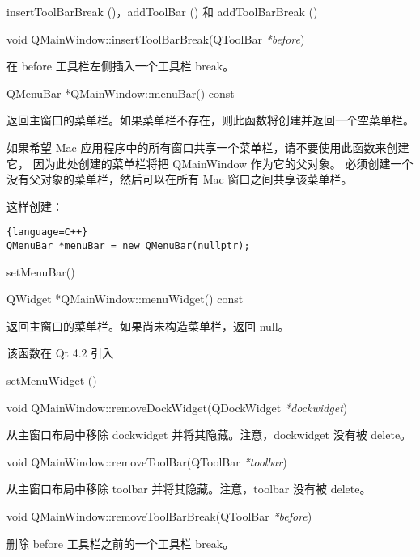 \begin{seeAlso}
insertToolBarBreak ()，addToolBar () 和 addToolBarBreak ()
\end{seeAlso}

\splitLine

void QMainWindow::insertToolBarBreak(QToolBar \emph{*before})

在 before 工具栏左侧插入一个工具栏 break。

\splitLine

QMenuBar *QMainWindow::menuBar() const

返回主窗口的菜单栏。如果菜单栏不存在，则此函数将创建并返回一个空菜单栏。

如果希望 Mac 应用程序中的所有窗口共享一个菜单栏，请不要使用此函数来创建它，
因为此处创建的菜单栏将把 QMainWindow 作为它的父对象。
必须创建一个没有父对象的菜单栏，然后可以在所有 Mac 窗口之间共享该菜单栏。

这样创建：

\begin{lstlisting}{language=C++}
QMenuBar *menuBar = new QMenuBar(nullptr);
\end{lstlisting}

\begin{seeAlso}
setMenuBar()
\end{seeAlso}

\splitLine

QWidget *QMainWindow::menuWidget() const

返回主窗口的菜单栏。如果尚未构造菜单栏，返回 null。

该函数在 Qt 4.2 引入

\begin{seeAlso}
setMenuWidget ()
\end{seeAlso}

\splitLine

void QMainWindow::removeDockWidget(QDockWidget \emph{*dockwidget})

从主窗口布局中移除 dockwidget 并将其隐藏。注意，dockwidget 没有被 delete。

\splitLine

void QMainWindow::removeToolBar(QToolBar \emph{*toolbar})

从主窗口布局中移除 toolbar 并将其隐藏。注意，toolbar 没有被 delete。

\splitLine

void QMainWindow::removeToolBarBreak(QToolBar \emph{*before})

删除 before 工具栏之前的一个工具栏 break。

